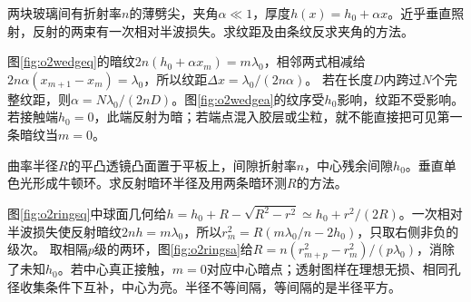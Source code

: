\begin{example}\label{ex:o2wedge}
两块玻璃间有折射率$n$的薄劈尖，夹角$\alpha\ll1$，厚度$h(x)=h_0+\alpha x$。近乎垂直照射，反射的两束有一次相对半波损失。求纹距及由条纹反求夹角的方法。
\end{example}
\begin{solution}
图\ref{fig:o2wedgeq}的暗纹$2n(h_0+\alpha x_m)=m\lambda_0$，相邻两式相减给$2n\alpha(x_{m+1}-x_m)=\lambda_0$，所以纹距$\Delta x=\lambda_0/(2n\alpha)$。
若在长度$D$内跨过$N$个完整纹距，则$\alpha=N\lambda_0/(2nD)$。图\ref{fig:o2wedgea}的纹序受$h_0$影响，纹距不受影响。若接触端$h_0=0$，此端反射为暗；若端点混入胶层或尘粒，就不能直接把可见第一条暗纹当$m=0$。
\end{solution}

\begin{example}\label{ex:o2rings}
曲率半径$R$的平凸透镜凸面置于平板上，间隙折射率$n$，中心残余间隙$h_0$。垂直单色光形成牛顿环。求反射暗环半径及用两条暗环测$R$的方法。
\end{example}
\begin{solution}
图\ref{fig:o2ringsq}中球面几何给$h=h_0+R-\sqrt{R^2-r^2}\simeq h_0+r^2/(2R)$。一次相对半波损失使反射暗纹$2nh=m\lambda_0$，所以$r_m^2=R(m\lambda_0/n-2h_0)$，只取右侧非负的级次。
取相隔$p$级的两环，图\ref{fig:o2ringsa}给$R=n(r_{m+p}^2-r_m^2)/(p\lambda_0)$，消除了未知$h_0$。若中心真正接触，$m=0$对应中心暗点；透射图样在理想无损、相同孔径收集条件下互补，中心为亮。半径不等间隔，等间隔的是半径平方。
\end{solution}

